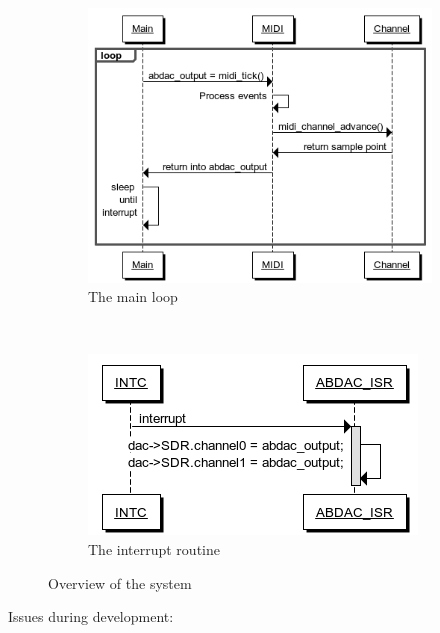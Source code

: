 \documentclass[a4paper,12pt]{article}
\begin{document}
\begin{figure}
        \centering
        \begin{subfigure}[b]{0.57\textwidth}
                \centering
                \includegraphics[width=\textwidth]{progflow}
                \caption{The main loop}
                \label{mainloop}
        \end{subfigure}%
        ~ 
        \begin{subfigure}[b]{0.52\textwidth}
                \centering
                \includegraphics[width=\textwidth]{interrupt}
                \caption{The interrupt routine}
                \label{interrupt}
        \end{subfigure}
      \caption{Overview of the system}
   \label{progflow}
\end{figure}


Issues during development:
\end{document}
